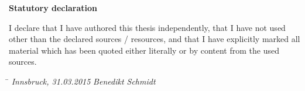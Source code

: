 \vspace{5cm}
\begin{center}
	\large
	\textbf{Statutory declaration}
\end{center}

I declare that I have authored this thesis independently, that I have not used other than the declared sources / resources, and that I have explicitly marked all material which has been quoted either literally or by content from the used sources.

\vspace{3cm}
\begin{tabbing}
	\hspace{6cm}  \= \kill
	\textit{Innsbruck, 31.03.2015} \> \textit{Benedikt Schmidt}
\end{tabbing}